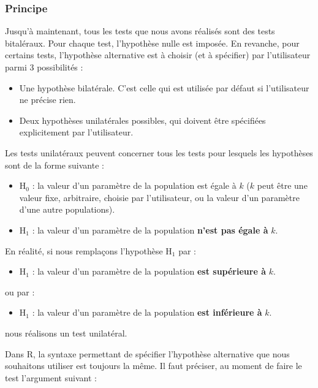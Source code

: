 \documentclass[
  a4paper,
]{article}
\providecommand{\tightlist}{%
  \setlength{\itemsep}{0pt}\setlength{\parskip}{0pt}}
\begin{document}
\hypertarget{principe}{%
\subsubsection{Principe}\label{principe}}

Jusqu'à maintenant, tous les tests que nous avons réalisés sont des tests bitaléraux. Pour chaque test, l'hypothèse nulle est imposée. En revanche, pour certains tests, l'hypothèse alternative est à choisir (et à spécifier) par l'utilisateur parmi 3 possibilités :

\begin{itemize}
\tightlist
\item
  Une hypothèse bilatérale. C'est celle qui est utilisée par défaut si l'utilisateur ne précise rien.
\item
  Deux hypothèses unilatérales possibles, qui doivent être spécifiées explicitement par l'utilisateur.
\end{itemize}

Les tests unilatéraux peuvent concerner tous les tests pour lesquels les hypothèses sont de la forme suivante :

\begin{itemize}
\tightlist
\item
  H\(_0\) : la valeur d'un paramètre de la population est égale à \(k\) (\(k\) peut être une valeur fixe, arbitraire, choisie par l'utilisateur, ou la valeur d'un paramètre d'une autre populations).
\item
  H\(_1\) : la valeur d'un paramètre de la population \textbf{n'est pas égale à} \(k\).
\end{itemize}

En réalité, si nous remplaçons l'hypothèse H\(_1\) par :

\begin{itemize}
\tightlist
\item
  H\(_1\) : la valeur d'un paramètre de la population \textbf{est supérieure à} \(k\).
\end{itemize}

ou par :

\begin{itemize}
\tightlist
\item
  H\(_1\) : la valeur d'un paramètre de la population \textbf{est inférieure à} \(k\).
\end{itemize}

nous réalisons un test unilatéral.

Dans R, la syntaxe permettant de spécifier l'hypothèse alternative que nous souhaitons utiliser est toujours la même. Il faut préciser, au moment de faire le test l'argument suivant :
\end{document}
